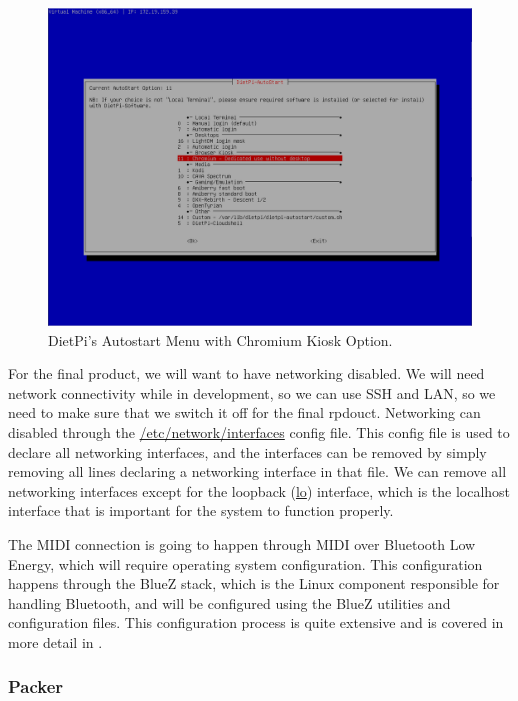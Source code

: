 \begin{figure}[h!]
  \centering
  \includegraphics[width=\linewidth]{image/dietpi-autostart.png}
  \caption{DietPi's Autostart Menu with Chromium Kiosk Option.}
  \label{fig:dietpi-autostart}
\end{figure}

For the final product, we will want to have networking disabled. We will need network
connectivity while in development, so we can use SSH and LAN, so we need to make sure that
we switch it off for the final rpdouct. Networking can disabled through the
\url{/etc/network/interfaces} config file. This config file is used to declare all
networking interfaces, and the interfaces can be removed by simply removing all lines
declaring a networking interface in that file. We can remove all networking interfaces
except for the loopback (\url{lo}) interface, which is the localhost interface that is
important for the system to function properly.

The MIDI connection is going to happen through MIDI over Bluetooth Low Energy, which will
require operating system configuration. This configuration happens through the BlueZ
stack, which is the Linux component responsible for handling Bluetooth, and will be
configured using the BlueZ utilities and configuration files. This configuration process
is quite extensive and is covered in more detail in .

\subsubsection{Packer}
\label{sec:packer}

